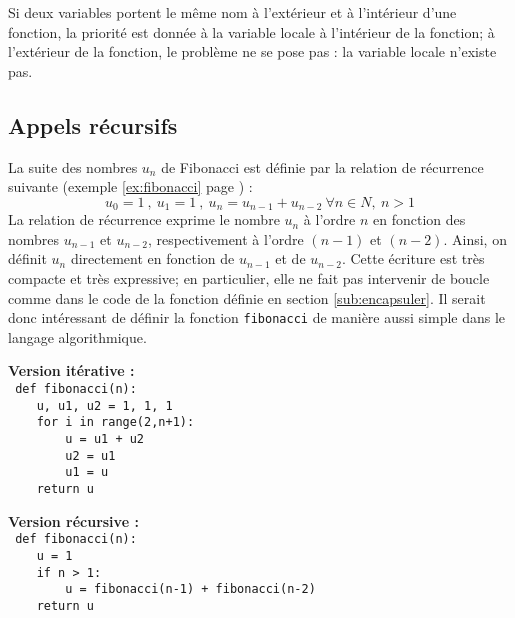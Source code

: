 \noindent Si deux variables portent le même nom à l'extérieur et à l'intérieur 
d'une fonction, la priorité est donnée à la variable locale à l'intérieur de la fonction;
à l'extérieur de la fonction, le problème ne se pose pas : la variable locale n'existe pas.


\subsection{Appels récursifs}\label{sub:recursivite}
La suite des nombres $u_n$ de Fibonacci est définie par la 
relation de récurrence suivante (exemple \ref{ex:fibonacci} 
page \pageref{ex:fibonacci}) :
$$u_0 = 1\ ,\ u_1 = 1\ ,\ u_n = u_{n-1} + u_{n-2}\ \forall n \in N,\ n > 1$$
La relation de récurrence exprime le nombre $u_n$ à l'ordre $n$ en fonction des nombres
$u_{n-1}$ et $u_{n-2}$, respectivement à l'ordre $(n-1)$ et $(n-2)$.
Ainsi, on définit $u_n$ directement en fonction de $u_{n-1}$ et de $u_{n-2}$.
Cette écriture est très compacte et très expressive; en particulier, 
elle ne fait pas intervenir de boucle comme dans le code de la fonction 
définie en section \ref{sub:encapsuler}.
Il serait donc intéressant de définir la fonction
{\tt fibonacci} de manière aussi simple dans le langage 
algorithmique.

\noindent\mbox{}\hspace*{1cm}\begin{py}{6cm}
{\bf Version itérative :}\\\tt
def fibonacci(n):\\
\mbox{}\ \ \ \ u, u1, u2 = 1, 1, 1\\
\mbox{}\ \ \ \ for i in range(2,n+1):\\
\mbox{}\ \ \ \ \ \ \ \ u = u1 + u2\\
\mbox{}\ \ \ \ \ \ \ \ u2 = u1\\
\mbox{}\ \ \ \ \ \ \ \ u1 = u\\
\mbox{}\ \ \ \ return u
\end{py}
\hfill
\begin{py}{6cm}
{\bf Version récursive :}\\\tt
def fibonacci(n):\\
\mbox{}\ \ \ \ u = 1\\
\mbox{}\ \ \ \ if n > 1:\\
\mbox{}\ \ \ \ \ \ \ \ \mbox{u = fibonacci(n-1) + fibonacci(n-2)}\\
\mbox{}\ \ \ \ return u
\end{py}
\hspace*{1cm}\mbox{}\vspace*{2mm}

